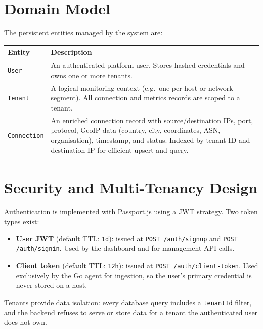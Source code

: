 \documentclass[12pt]{report}
\begin{document}
\section{Domain Model}

The persistent entities managed by the system are:

\begin{center}
\begin{tabular}{lp{9cm}}
\toprule
\textbf{Entity} & \textbf{Description} \\
\midrule
\texttt{User}       & An authenticated platform user. Stores hashed credentials and
                       owns one or more tenants. \\
\texttt{Tenant}     & A logical monitoring context (e.g.\ one per host or network
                       segment). All connection and metrics records are scoped to a
                       tenant. \\
\texttt{Connection} & An enriched connection record with source/destination IPs,
                       port, protocol, GeoIP data (country, city, coordinates, ASN,
                       organisation), timestamp, and status. Indexed by tenant ID and
                       destination IP for efficient upsert and query. \\
\bottomrule
\end{tabular}
\end{center}

\section{Security and Multi-Tenancy Design}

Authentication is implemented with Passport.js using a JWT strategy. Two token types exist:

\begin{itemize}
    \item \textbf{User JWT} (default TTL: \texttt{1d}): issued at
          \texttt{POST /auth/signup} and \texttt{POST /auth/signin}. Used by the dashboard and
          for management API calls.
    \item \textbf{Client token} (default TTL: \texttt{12h}): issued at
          \texttt{POST /auth/client-token}. Used exclusively by the Go agent for ingestion, so
          the user's primary credential is never stored on a host.
\end{itemize}

Tenants provide data isolation: every database query includes a \texttt{tenantId} filter, and
the backend refuses to serve or store data for a tenant the authenticated user does not own.
\end{document}
